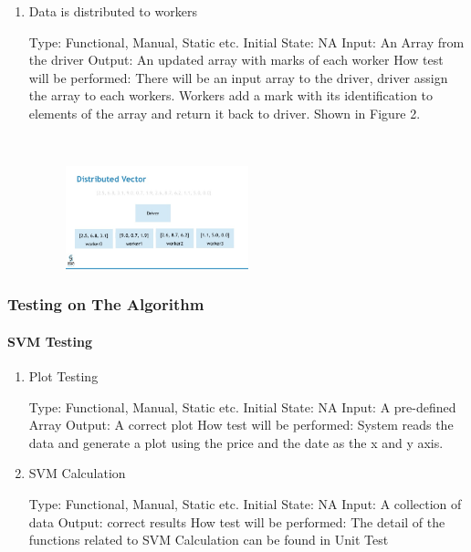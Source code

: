 \documentclass[12pt, titlepage]{article}
\begin{document}
\begin{enumerate}

\item{Data is distributed to workers\\}

Type: Functional, Manual, Static etc.
Initial State: NA
Input: An Array from the driver
Output: An updated array with marks of each worker
How test will be performed: There will be an input array to the driver, driver assign the array to each workers. Workers add a mark with its identification to elements of the array and return it back to driver. Shown in Figure 2.

~\newline
\begin{figure}[h!]
\begin{center}
{
\includegraphics[width=0.5\textwidth]{sparkrdd.png}
}
\caption{\label{Input Data}}
\end{center}
\end{figure}

\end{enumerate}

\subsubsection{Testing on The Algorithm}

\paragraph{SVM Testing}

\begin{enumerate}

\item{Plot Testing\\}

Type: Functional, Manual, Static etc.
Initial State: NA
Input: A pre-defined Array
Output: A correct plot
How test will be performed: System reads the data and generate a plot using the price and the date as the x and y axis.

\item{SVM Calculation \\}

Type: Functional, Manual, Static etc.
Initial State: NA
Input: A collection of data
Output: correct results
How test will be performed: The detail of the functions related to SVM Calculation can be found in Unit Test

\end{enumerate}
\end{document}
